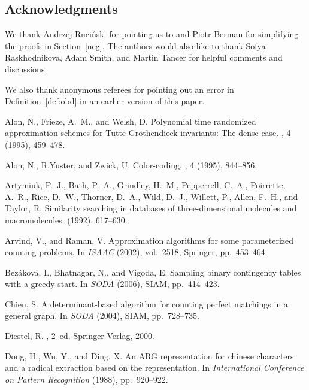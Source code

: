 \documentclass[11pt]{article}
\begin{document}
\subsection*{Acknowledgments}
We thank Andrzej Ruci\'nski for pointing us to \cite{riordan} and Piotr Berman for simplifying the proofs in Section~\ref{neg}. The authors would also like to thank Sofya Raskhodnikova, Adam Smith, and Martin Tancer for helpful comments and discussions. 

We also thank anonymous referees for pointing out an error in Definition~\ref{def:obd} in an earlier version of this paper.


\begin{thebibliography}{10}

{\sc Alon, N., Frieze, A.~M., and Welsh, D.}
\newblock Polynomial time randomized approximation schemes for
  {T}utte-{G}r{\"o}thendieck invariants: The dense case.
, 4 (1995), 459--478.

{\sc Alon, N., R.Yuster, and Zwick, U.}
\newblock Color-coding.
, 4 (1995), 844--856.

{\sc Artymiuk, P.~J., Bath, P.~A., Grindley, H.~M., Pepperrell, C.~A.,
  Poirrette, A.~R., Rice, D.~W., Thorner, D.~A., Wild, D.~J., Willett, P.,
  Allen, F.~H., and Taylor, R.}
\newblock Similarity searching in databases of three-dimensional molecules and
  macromolecules.
  (1992), 617--630.

{\sc Arvind, V., and Raman, V.}
\newblock Approximation algorithms for some parameterized counting problems.
\newblock In {\em ISAAC\/} (2002), vol.~2518, Springer, pp.~453--464.

{\sc Bez{\'a}kov{\'a}, I., Bhatnagar, N., and Vigoda, E.}
\newblock Sampling binary contingency tables with a greedy start.
\newblock In {\em SODA\/} (2006), SIAM, pp.~414--423.

{\sc Chien, S.}
\newblock A determinant-based algorithm for counting perfect matchings in a
  general graph.
\newblock In {\em SODA\/} (2004), SIAM, pp.~728--735.

{\sc Diestel, R.}
, 2~ed.
\newblock Springer-Verlag, 2000.

{\sc Dong, H., Wu, Y., and Ding, X.}
\newblock An {ARG} representation for chinese characters and a radical
  extraction based on the representation.
\newblock In {\em International Conference on Pattern Recognition\/} (1988),
  pp.~920--922.


\end{thebibliography}
\end{document}
